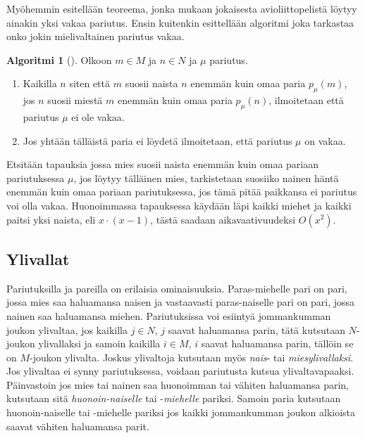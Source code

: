 \documentclass[finnish]{tktltiki2}
\theoremstyle{definition}
\newtheorem{alg}[lau]{Algoritmi}
\theoremstyle{remark}
\begin{document}
Myöhemmin esitellään teoreema, jonka mukaan jokaisesta avioliittopelistä löytyy ainakin yksi vakaa pariutus. Ensin kuitenkin esittellään algoritmi joka tarkastaa onko jokin mielivaltainen pariutus vakaa.
\begin{alg}[\cite{gusfield1989stable}]
Olkoon $m \in M$ ja $n \in N$ ja $\mu$ pariutus.
\begin{enumerate}
	\item Kaikilla $n$ siten että $m$ suosii naista $n$ enemmän kuin omaa paria $p_{\mu}(m)$, jos $n$ suosii miestä $m$ enemmän kuin omaa paria $p_{\mu}(n)$, ilmoitetaan että pariutus $\mu$ ei ole vakaa.
	\item Jos yhtään tälläistä paria ei löydetä ilmoitetaan, että pariutus $\mu$ on vakaa.
\end{enumerate}
\end{alg}

Etsitään tapauksia jossa mies suosii naista enemmän kuin omaa pariaan pariutuksessa $\mu$,
jos löytyy tälläinen mies, tarkistetaan suosiiko nainen häntä enemmän kuin omaa pariaan pariutuksessa, jos tämä pitää paikkansa ei pariutus voi olla vakaa.
Huonoimmassa tapauksessa käydään läpi kaikki miehet ja kaikki paitsi yksi naista, eli $x\cdot(x-1)$, tästä saadaan aikavaativuudeksi $O(x^2)$.

\subsection{Ylivallat}
Pariutuksilla ja pareilla on erilaisia ominaisuuksia. Paras-miehelle pari on pari, jossa mies saa haluamansa naisen ja vastaavasti paras-naiselle pari on pari, jossa nainen saa haluamansa miehen. Pariutuksissa voi esiintyä jommankumman joukon ylivaltaa, jos kaikilla $j \in N$, $j$ saavat haluamansa parin, tätä kutsutaan $N$-joukon ylivallaksi ja samoin kaikilla $i \in M$, $i$ saavat haluamansa parin, tällöin se on $M$-joukon ylivalta. Joskus ylivaltoja kutsutaan myös \emph{nais}- tai \emph{miesylivallaksi}. Jos ylivaltaa ei synny pariutuksessa, voidaan pariutusta kutsua ylivaltavapaaksi.
Päinvastoin jos mies tai nainen saa huonoimman tai vähiten haluamansa parin, kutsutaan sitä \emph{huonoin-naiselle} tai -\emph{miehelle} pariksi. Samoin paria kutsutaan huonoin-naiselle tai -miehelle pariksi jos kaikki jommankumman joukon alkioista saavat vähiten haluamansa parit.
\end{document}
